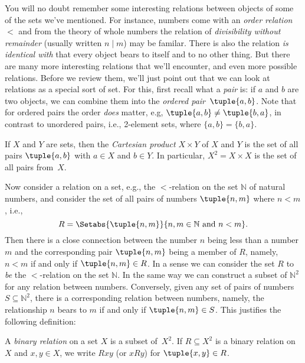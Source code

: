 \documentclass[../../../include/open-logic-section]{subfiles}
\begin{document}

\begin{explain}
You will no doubt remember some interesting relations between objects
of some of the sets we've mentioned. For instance, numbers come with
an \emph{order relation}~$<$ and from the theory of whole numbers the
relation of \emph{divisibility without remainder} (usually written
$n\mid m$) may be familar. There is also the relation \emph{is
  identical with} that every object bears to itself and to no other
thing. But there are many more interesting relations that we'll
encounter, and even more possible relations. Before we review them,
we'll just point out that we can look at relations as a special sort
of set. For this, first recall what a \emph{pair} is: if $a$ and $b$
are two objects, we can combine them into the \emph{ordered
  pair}~$\tuple{a, b}$. Note that for ordered pairs the order
\emph{does} matter, e.g, $\tuple{a, b} \neq \tuple{b, a}$, in contrast
to unordered pairs, i.e., 2-element sets, where $\{a, b\}=\{b, a\}$.

If $X$ and $Y$ are sets, then the \emph{Cartesian product} $X \times Y$
of $X$ and $Y$ is the set of all pairs $\tuple{a, b}$ with $a \in X$ and
$b \in Y$. In particular, $X^{2}=X \times X$ is the set of all pairs
from~$X$.

Now consider a relation on a set, e.g., the $<$-relation on the set
$\mathbb{N}$ of natural numbers, and consider the set of all pairs of
numbers $\tuple{n, m}$ where $n<m$, i.e.,
\[
R=\Setabs{\tuple{n, m}}{n, m \in \mathbb{N} \text{ and } n<m}.
\]
Then there is a close connection between the number $n$ being less
than a number $m$ and the corresponding pair $\tuple{n, m}$
being a member of $R$, namely, $n<m$ if and only if $\tuple{n, m}
\in R$. In a sense we can consider the set $R$ to \emph{be} the
$<$-relation on the set $\mathbb{N}$. In the same way we can construct
a subset of $\mathbb{N}^{2}$ for any relation between
numbers. Conversely, given any set of pairs of numbers
$S\subseteq\mathbb{N}^{2}$, there is a corresponding relation between
numbers, namely, the relationship $n$ bears to $m$ if and only if
$\tuple{n, m} \in S$. This justifies the following definition:
\end{explain}

\begin{defn}
A \emph{binary relation} on a set $X$ is a subset of~$X^{2}$. If
$R\subseteq X^{2}$ is a binary relation on~$X$ and $x, y \in X$,
we write $Rxy$ (or $xRy$) for $\tuple{x, y} \in R$.
\end{defn}
\end{document}
